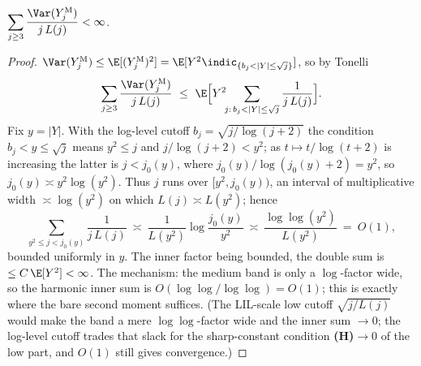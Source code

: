 \begin{lemma}\label{lem:hw_medium_var}
\leanok
{}
$\displaystyle\sum_{j\ge3}\frac{\Var(Y_j^{\mathrm M})}{j\,L(j)}<\infty$.
\end{lemma}
\begin{proof}
$\Var(Y_j^{\mathrm M})\le\E[(Y_j^{\mathrm M})^2]=\E[Y^2\indic_{\{b_j<|Y|\le\sqrt j\}}]$,
so by Tonelli
\[
  \sum_{j\ge3}\frac{\Var(Y_j^{\mathrm M})}{j\,L(j)}\ \le\
  \E\Big[Y^2\!\!\sum_{j:\,b_j<|Y|\le\sqrt j}\frac{1}{j\,L(j)}\Big].
\]
Fix $y=|Y|$. With the log-level cutoff $b_j=\sqrt{j/\log(j+2)}$ the condition
$b_j<y\le\sqrt j$ means $y^2\le j$ and $j/\log(j+2)<y^2$; as $t\mapsto t/\log(t+2)$ is
increasing the latter is $j<j_0(y)$, where $j_0(y)/\log(j_0(y)+2)=y^2$, so
$j_0(y)\asymp y^2\log(y^2)$. Thus $j$ runs over $[y^2,j_0(y))$, an interval of
multiplicative width $\asymp\log(y^2)$ on which $L(j)\asymp L(y^2)$; hence
\[
  \sum_{y^2\le j<j_0(y)}\frac{1}{j\,L(j)}\ \asymp\
  \frac{1}{L(y^2)}\log\frac{j_0(y)}{y^2}\ \asymp\
  \frac{\log\log(y^2)}{L(y^2)}\ =\ O(1),
\]
bounded uniformly in $y$. The inner factor being bounded, the double sum is
$\le C\,\E[Y^2]<\infty$. The mechanism: the medium band is only a $\log$-factor wide, so
the harmonic inner sum is $O(\log\log/\log\log)=O(1)$; this is exactly where the bare
second moment suffices. (The LIL-scale low cutoff $\sqrt{j/L(j)}$ would make the band a
mere $\log\log$-factor wide and the inner sum $\to0$; the log-level cutoff trades that
slack for the sharp-constant condition \textbf{(H)}$\to0$ of the low part, and $O(1)$
still gives convergence.)


\end{proof}
